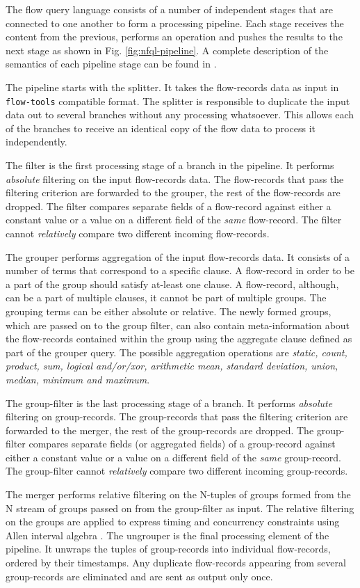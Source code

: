 The flow query language consists of a number of independent stages that are
connected to one another to form a processing pipeline.  Each stage receives
the content from the previous, performs an operation and pushes the results to
the next stage as shown in Fig. \ref{fig:nfql-pipeline}. A complete
description of the semantics of each pipeline stage can be found in
\cite{vmarinov:2009}.

The pipeline starts with the splitter. It takes the flow-records data as input
in \texttt{flow-tools} compatible format. The splitter is responsible to
duplicate the input data out to several branches without any processing
whatsoever. This allows each of the branches to receive an identical copy of
the flow data to process it independently.

The filter is the first processing stage of a branch in the pipeline.  It
performs \emph{absolute} filtering on the input flow-records data.  The
flow-records that pass the filtering criterion are forwarded to the grouper,
the rest of the flow-records are dropped. The filter compares separate fields
of a flow-record against either a constant value or a value on a different
field of the \emph{same} flow-record. The filter cannot \emph{relatively}
compare two different incoming flow-records.

The grouper performs aggregation of the input flow-records data. It consists
of a number of terms that correspond to a specific clause. A flow-record in
order to be a part of the group should satisfy at-least one clause. A
flow-record, although, can be a part of multiple clauses, it cannot be part of
multiple groups. The grouping terms can be either absolute or relative. The
newly formed groups, which are passed on to the group filter, can also contain
meta-information about the flow-records contained within the group using the
aggregate clause defined as part of the grouper query. The possible
aggregation operations are \emph{static, count, product, sum, logical
and/or/xor, arithmetic mean, standard deviation, union, median, minimum and
maximum}.

The group-filter is the last processing stage of a branch. It performs
\emph{absolute} filtering on group-records. The group-records
that pass the filtering criterion are forwarded to the merger, the rest of the
group-records are dropped. The group-filter compares separate fields (or
aggregated fields) of a group-record against either a constant value or a value
on a different field of the \emph{same} group-record. The group-filter cannot
\emph{relatively} compare two different incoming group-records.

The merger performs relative filtering on the N-tuples of groups formed from
the N stream of groups passed on from the group-filter as input. The relative
filtering on the groups are applied to express timing and concurrency
constraints using Allen interval algebra \cite{fallen:1983}. The ungrouper is
the final processing element of the pipeline. It unwraps the tuples of
group-records into individual flow-records, ordered by their timestamps. Any
duplicate flow-records appearing from several group-records are eliminated and
are sent as output only once.
